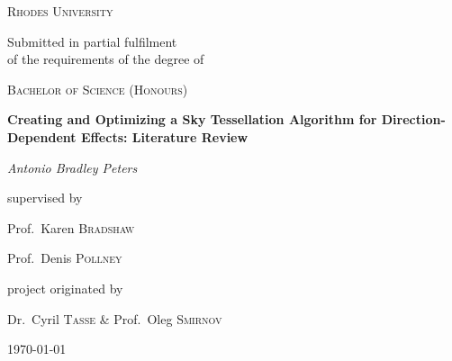 \begin{titlepage}
  \centering
  {\scshape\LARGE Rhodes University \par}
  \vspace{1cm}
  {\Large Submitted in partial fulfilment\\of the requirements of the degree of \par}
  \vspace{0.5cm}
  {\scshape\Large Bachelor of Science (Honours)\par}
  \vspace{1.5cm}
  {\huge\bfseries Creating and Optimizing a Sky Tessellation Algorithm for Direction-Dependent Effects: Literature Review\par}
  \vspace{2cm}
  {\Large\itshape Antonio Bradley Peters\par}
  \vfill
  supervised by\par
  Prof.~Karen \textsc{Bradshaw}\par
  Prof.~Denis \textsc{Pollney}\par
  \vspace{1cm}
  project originated by\par
  Dr.~Cyril \textsc{Tasse} \& Prof.~Oleg \textsc{Smirnov}
  \vfill
  {\large \today\par}
\end{titlepage}
